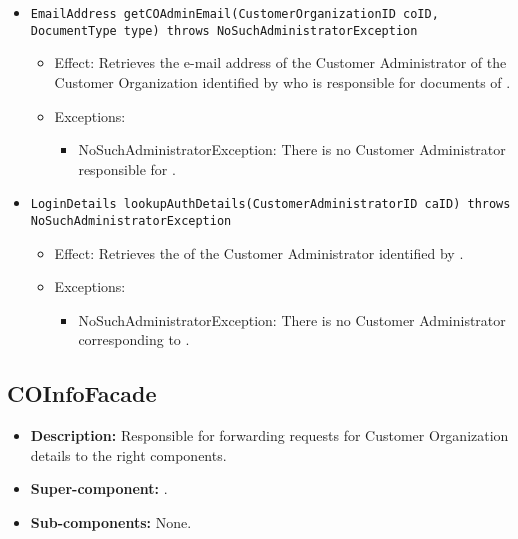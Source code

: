 \begin{itemize}
\begin{itemize}
		\item \texttt{EmailAddress getCOAdminEmail(CustomerOrganizationID coID, DocumentType type) throws NoSuchAdministratorException}
		    \begin{itemize}
                \item Effect: Retrieves the e-mail address of the Customer Administrator of the Customer Organization identified by  who is responsible for documents of .
                \item Exceptions:
				\begin{itemize}
					\item NoSuchAdministratorException: There is no Customer Administrator responsible for .
				\end{itemize}
            \end{itemize}

		\item \texttt{LoginDetails lookupAuthDetails(CustomerAdministratorID caID) throws NoSuchAdministratorException}
		    \begin{itemize}
                \item Effect: Retrieves the  of the Customer Administrator identified by .
                \item Exceptions:
				\begin{itemize}
					\item NoSuchAdministratorException: There is no Customer Administrator corresponding to .
				\end{itemize}
            \end{itemize}
    \end{itemize}
\end{itemize}

\subsection{COInfoFacade}
\begin{itemize}
    \item \textbf{Description:} Responsible for forwarding requests for Customer Organization details to the right components.
    \item \textbf{Super-component:} .
    \item \textbf{Sub-components:} None.
\end{itemize}

